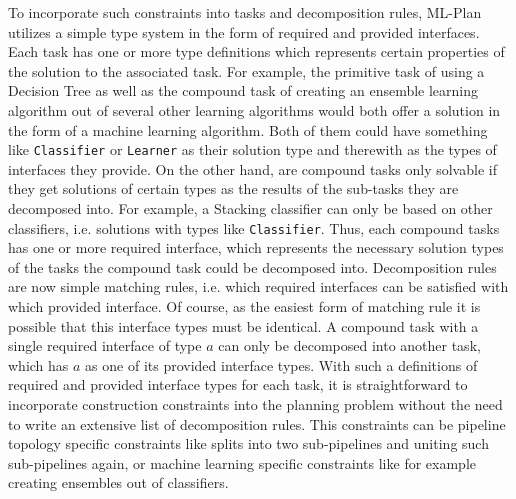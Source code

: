 To incorporate such constraints into tasks and decomposition rules, ML-Plan utilizes a simple type system in the form of required and provided interfaces.
Each task has one or more type definitions which represents certain properties of the solution to the associated task.
For example, the primitive task of using a Decision Tree as well as the compound task of creating an ensemble learning algorithm out of several other learning algorithms would both offer a solution in the form of a machine learning algorithm.
Both of them could have something like \texttt{Classifier} or \texttt{Learner} as their solution type and therewith as the types of interfaces they provide.\newline
On the other hand, are compound tasks only solvable if they get solutions of certain types as the results of the sub-tasks they are decomposed into.
For example, a Stacking classifier can only be based on other classifiers, i.e. solutions with types like \texttt{Classifier}.
Thus, each compound tasks has one or more required interface, which represents the necessary solution types of the tasks the compound task could be decomposed into.\newline
Decomposition rules are now simple matching rules, i.e. which required interfaces can be satisfied with which provided interface.
Of course, as the easiest form of matching rule it is possible that this interface types must be identical.
A compound task with a single required interface of type $a$ can only be decomposed into another task, which has $a$ as one of its provided interface types.
With such a definitions of required and provided interface types for each task, it is straightforward to incorporate construction constraints into the planning problem without the need to write an extensive list of decomposition rules.
This constraints can be pipeline topology specific constraints like splits into two sub-pipelines and uniting such sub-pipelines again, or machine learning specific constraints like for example creating ensembles out of classifiers.

